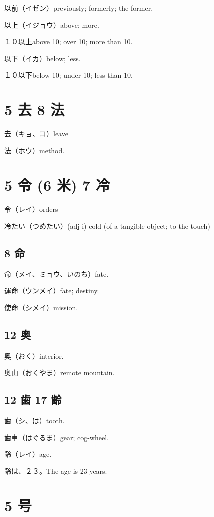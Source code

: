 以前（イゼン）previously; formerly; the former.

以上（イジョウ）above; more.

１０以上above 10; over 10; more than 10.

以下（イカ）below; less.

１０以下below 10; under 10; less than 10.

\section{5 去 8 法}

去（キョ、コ）leave

法（ホウ）method.

\section{5 令 (6 米) 7 冷}

令（レイ）orders

冷たい（つめたい）(adj-i) cold (of a tangible object; to the touch)

\subsection{8 命}

命（メイ、ミョウ、いのち）fate.

運命（ウンメイ）fate; destiny.

使命（シメイ）mission.

\subsection{12 奥}

奥（おく）interior.

奥山（おくやま）remote mountain.

\subsection{12 歯 17 齢}

歯（シ、は）tooth.

歯車（はぐるま）gear; cog-wheel.

齢（レイ）age.

齢は、２３。The age is 23 years.

\section{5 号}


